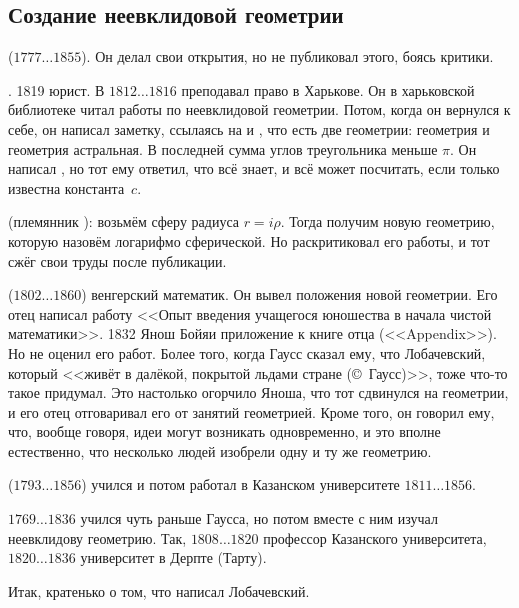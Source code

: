 \documentclass[a4paper,oneside,fleqn,10pt]{article}
\newcommand{\pe}[2]{${#1}\ldots{#2}$}
\begin{document}
\subsection{Создание неевклидовой геометрии}

 (\pe{1777}{1855}). Он делал свои открытия,
но не публиковал этого, боясь критики.

. 1819 юрист. В \pe{1812}{1816} преподавал право в Харькове.
Он в харьковской библиотеке читал работы  по неевклидовой геометрии.
Потом, когда он вернулся к себе, он написал заметку, ссылаясь на 
и , что есть две геометрии: геометрия  и геометрия астральная.
В последней сумма углов треугольника меньше $\pi$. Он написал ,
но тот ему ответил, что всё знает, и всё может посчитать, если только известна константа~$c$.

 (племянник ): возьмём сферу радиуса $r = i\rho$. Тогда получим новую геометрию,
которую назовём логарифмо сферической. Но  раскритиковал его работы,
и тот сжёг свои труды после публикации.

 (\pe{1802}{1860}) венгерский математик.
Он вывел положения новой геометрии. Его отец 
написал работу <<Опыт введения учащегося юношества в начала чистой математики>>.
1832 Янош Бойяи приложение к книге отца (<<Appendix>>). Но  не оценил его работ.
Более того, когда Гаусс сказал ему, что Лобачевский, который <<живёт в далёкой, покрытой льдами стране (\copyright~Гаусс)>>,
тоже что-то такое придумал.
Это настолько огорчило Яноша, что тот сдвинулся на геометрии,
и его отец отговаривал его от занятий геометрией. Кроме того,
он говорил ему, что, вообще говоря, идеи могут возникать одновременно,
и это вполне естественно, что несколько людей изобрели одну и ту же
геометрию.

 (\pe{1793}{1856})
учился и потом работал в Казанском университете \pe{1811}{1856}.

 \pe{1769}{1836} учился чуть раньше Гаусса, но потом вместе с ним
изучал неевклидову геометрию. Так, \pe{1808}{1820} профессор Казанского
университета, \pe{1820}{1836} университет в Дерпте (Тарту).

Итак, кратенько о том, что написал Лобачевский.
\end{document}
